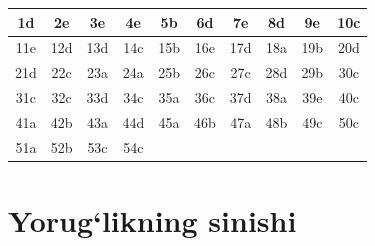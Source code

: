 \begin{center}
\renewcommand{\arraystretch}{1.2}
\begin{tabular}{|c|c|c|c|c|c|c|c|c|c|}
\hline
1d & 2e & 3e & 4e & 5b & 6d & 7e & 8d & 9e & 10c \\
\hline
11e & 12d & 13d & 14c & 15b & 16e & 17d & 18a & 19b & 20d \\
\hline
21d & 22c & 23a & 24a & 25b & 26c & 27c & 28d & 29b & 30c \\
\hline
31c & 32c & 33d & 34c & 35a & 36c & 37d & 38a & 39e & 40c \\
\hline
41a & 42b & 43a & 44d & 45a & 46b & 47a & 48b & 49c & 50c \\
\hline
51a & 52b & 53c & 54c & & & & & & \\
\hline
\end{tabular}
\end{center}





\section{Yorug‘likning sinishi}

